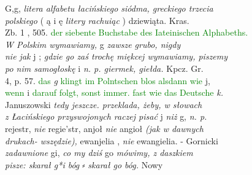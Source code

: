 \documentclass[12pt]{article}
\newcommand{\doh}[1]{⸗}
\begin{document}
\newpage
\large
\textup{G,g,} \textit{litera alfabetu łacińskiego siódma, greckiego trzecia}\\ 
\vspace{0.3cm}
\textit{polskiego} \textup{( ą i ę}  \textit{ litery rachuiąc} \textup{) dziewiąta.} \textup{Kras.} \\
\vspace{0.3cm}
\textup{Zb. 1 , 505.} \textcolor{green}{ der siebente Buchstabe des Iateinischen Alphabeths.} \\
\vspace{0.3cm}
\textit{W Polskim wymawiamy,} \textup{g} \textit{zawsze grubo, nigdy} \\
\vspace{0.3cm}
\textit{nie jak} \textup{j ;} \textit{gdzie go zaś trochę miękcej wymawiamy, piszemy} \\
\vspace{0.3cm}
\textit{po nim samogłoskę } \textup{i} \textit{ n. p. giermek, giełda.} \textup{Kpcz. Gr.} \\
\vspace{0.3cm}
\textup{4, p. 57.} \textcolor{green}{ das} \textit{g} \textcolor{green}{ klingt im Polntschen blos alsdann wie} \textup{ j,} \\
\vspace{0.3cm}
\textcolor{green}{wenn} \textup{ i } \textcolor{green}{darauf folgt, sonst immer. fast wie das Deutsche}  \textit{k.} \\
\vspace{0.3cm}
\textup{Januszowski} \textit{tedy jeszcze. przeklada, żeby, w słowach} \\
\vspace{0.3cm}
\textit{z Łacińskiego przyswojonych raczej pisać} \textup{j} \textit{niż} \textup{g,} \textit{n. p. }\\
\vspace{0.3cm}
\textup{rejestr,} \textit{ nie} \textup{ regie'str, anjoł } \textit{ nie} \textup{ angioł } \textit{(jak w dawnych} \\
\vspace{0.3cm}
\textit{drukach- wszędzie),} \textup{ ewanjelia , } \textit{nie} \textup{ ewangielia. - Gornicki} \\
\vspace{0.3cm}
\textit{zadawnione} \textup{ gi, } \textit{ co my dziś } \textup{go} \textit{ mówimy, z daszkiem} \\
\vspace{0.3cm}
\textit{pisze: skarał g*i bóg} \doh{} \textit{skarał go bóg.} \textup{Nowy} \\
\end{document}
